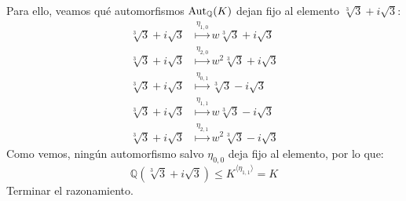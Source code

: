 \begin{ejercicio}
\begin{enumerate}
            Para ello, veamos qué automorfismos $\operatorname{Aut}_\mathbb{Q}(K)$ dejan fijo al elemento $\sqrt[3]{3}+i\sqrt{3}$:
            \begin{align*}
                \sqrt[3]{3}+i\sqrt{3} &\stackrel{\eta_{1,0}}{\longmapsto} w\sqrt[3]{3} + i \sqrt{3} \\
                \sqrt[3]{3}+i\sqrt{3} &\stackrel{\eta_{2,0}}{\longmapsto} w^2\sqrt[3]{3} + i \sqrt{3} \\
                \sqrt[3]{3}+i\sqrt{3} &\stackrel{\eta_{0,1}}{\longmapsto} \sqrt[3]{3} - i\sqrt{3} \\
                \sqrt[3]{3}+i\sqrt{3} &\stackrel{\eta_{1,1}}{\longmapsto} w\sqrt[3]{3} - i\sqrt{3} \\
                \sqrt[3]{3}+i\sqrt{3} &\stackrel{\eta_{2,1}}{\longmapsto} w^2\sqrt[3]{3} - i\sqrt{3} 
            \end{align*}
            Como vemos, ningún automorfismo salvo $\eta_{0,0}$ deja fijo al elemento, por lo que:
            \begin{equation*}
                \mathbb{Q}\left(\sqrt[3]{3}+i\sqrt{3}\right) \leq K^{\langle \eta_{1,1} \rangle } = K
            \end{equation*} %
            Terminar el razonamiento.
    \end{enumerate}
\end{ejercicio}
